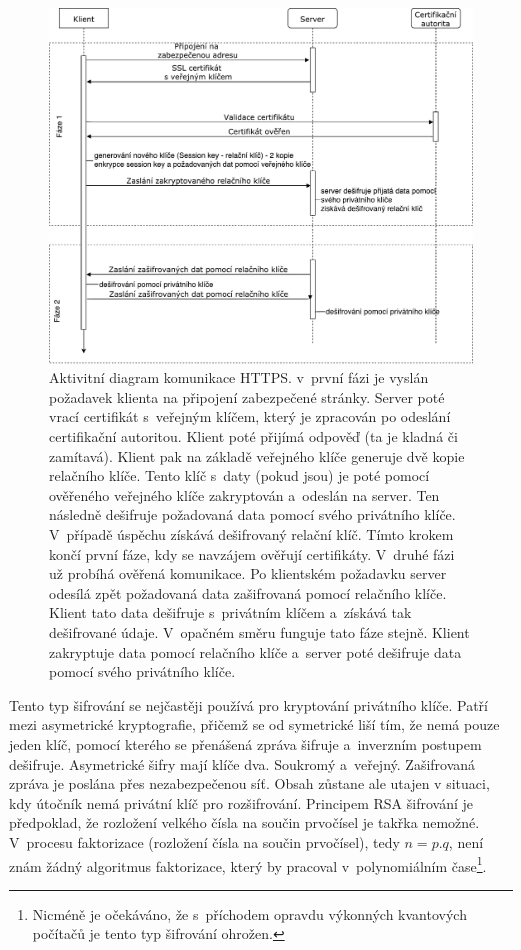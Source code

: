 \begin{figure}[H]
	\centering
	\includegraphics[width=16cm]{../HTTPS.pdf}
	\caption{Aktivitní diagram komunikace HTTPS. v~první fázi je vyslán požadavek klienta na připojení zabezpečené stránky. Server poté vrací certifikát s~veřejným klíčem, který je zpracován po odeslání certifikační autoritou. Klient poté přijímá odpověď (ta je kladná či zamítavá). Klient pak na základě veřejného klíče generuje dvě kopie relačního klíče. Tento klíč s~daty (pokud jsou) je poté pomocí ověřeného veřejného klíče zakryptován a~odeslán na server. Ten následně dešifruje požadovaná data pomocí svého privátního klíče. V~případě úspěchu získává dešifrovaný relační klíč. Tímto krokem končí první fáze, kdy se navzájem ověřují certifikáty. V~druhé fázi už probíhá ověřená komunikace. Po klientském požadavku server odesílá zpět požadovaná data zašifrovaná pomocí relačního klíče. Klient tato data dešifruje s~privátním klíčem a~získává tak dešifrované údaje. V~opačném směru funguje tato fáze stejně. Klient zakryptuje data pomocí relačního klíče a~server poté dešifruje data pomocí svého privátního klíče.}
	\label{fig:HTTPS}
\end{figure}


Tento typ šifrování se nejčastěji používá pro kryptování privátního klíče. Patří mezi asymetrické kryptografie, přičemž se od symetrické liší tím, že nemá pouze jeden klíč, pomocí kterého se přenášená zpráva šifruje a~inverzním postupem dešifruje. Asymetrické šifry mají klíče dva. Soukromý a~veřejný. Zašifrovaná zpráva je poslána přes nezabezpečenou síť. Obsah zůstane ale utajen v situaci, kdy útočník nemá privátní klíč pro rozšifrování. 
Principem RSA šifrování je předpoklad, že rozložení velkého čísla na součin prvočísel je takřka nemožné. V~procesu faktorizace (rozložení čísla na součin prvočísel), tedy $ n = p.q $, není znám žádný algoritmus faktorizace, který by pracoval v~polynomiálním čase\footnote{Nicméně je očekáváno, že s~příchodem opravdu výkonných kvantových počítačů je tento typ šifrování ohrožen.}.\cite{6}



